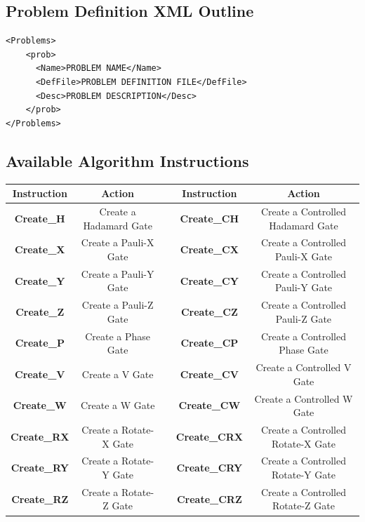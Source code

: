 \section{Problem Definition XML Outline}
\label{sec:probmanspecxml}
\lstset{language = XML}
\begin{lstlisting}
<Problems>
	<prob>
	  <Name>PROBLEM NAME</Name>
	  <DefFile>PROBLEM DEFINITION FILE</DefFile>
	  <Desc>PROBLEM DESCRIPTION</Desc>
	</prob>
</Problems>
\end{lstlisting}

\clearpage
\begin{landscape}

\chapter{Available Algorithm Instructions}
\label{sec:alginstructionlist}
\centering
\begin{tabular}{|c|c|c|c|c|}
\hline
\textbf{Instruction} & \textbf{Action} & & \textbf{Instruction} & \textbf{Action}  \\
\hline
\textbf{Create\_H} & Create a Hadamard Gate & & \textbf{Create\_CH} & Create a Controlled Hadamard Gate \\
\hline
\textbf{Create\_X} & Create a Pauli-X Gate & & \textbf{Create\_CX} & Create a Controlled Pauli-X Gate \\
\hline
\textbf{Create\_Y} & Create a Pauli-Y Gate & & \textbf{Create\_CY} & Create a Controlled Pauli-Y Gate \\
\hline
\textbf{Create\_Z} & Create a Pauli-Z Gate & & \textbf{Create\_CZ} & Create a Controlled Pauli-Z Gate \\
\hline
\textbf{Create\_P} & Create a Phase Gate & & \textbf{Create\_CP} & Create a Controlled Phase Gate \\
\hline
\textbf{Create\_V} & Create a V Gate & & \textbf{Create\_CV} & Create a Controlled V Gate \\
\hline
\textbf{Create\_W} & Create a W Gate & & \textbf{Create\_CW} & Create a Controlled W Gate \\
\hline
\textbf{Create\_RX} & Create a Rotate-X Gate & & \textbf{Create\_CRX} & Create a Controlled Rotate-X Gate \\
\hline
\textbf{Create\_RY} & Create a Rotate-Y Gate & & \textbf{Create\_CRY} & Create a Controlled Rotate-Y Gate \\
\hline
\textbf{Create\_RZ} & Create a Rotate-Z Gate & & \textbf{Create\_CRZ} & Create a Controlled Rotate-Z Gate \\

\end{tabular}
\end{landscape}
